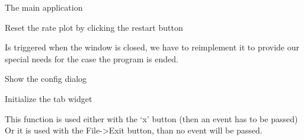 \documentclass[letterpaper,10pt,english]{sphinxmanual}
\begin{document}
\begin{fulllineitems}
\label{muonic:muonic.gui.MainWindow.MainWindow}
The main application

\begin{fulllineitems}
\label{muonic:muonic.gui.MainWindow.MainWindow.clear_function}
Reset the rate plot by clicking the restart button

\end{fulllineitems}


\begin{fulllineitems}
\label{muonic:muonic.gui.MainWindow.MainWindow.closeEvent}
Is triggered when the window is closed, we have to reimplement it
to provide our special needs for the case the program is ended.

\end{fulllineitems}


\begin{fulllineitems}
\label{muonic:muonic.gui.MainWindow.MainWindow.config_menu}
Show the config dialog

\end{fulllineitems}


\begin{fulllineitems}
\label{muonic:muonic.gui.MainWindow.MainWindow.create_widgets}
Initialize the tab widget

\end{fulllineitems}


\begin{fulllineitems}
\label{muonic:muonic.gui.MainWindow.MainWindow.exit_program}
This function is used either with the `x' button
(then an event has to be passed)
Or it is used with the File-\textgreater{}Exit button, than no event
will be passed.


\end{fulllineitems}
\end{fulllineitems}
\end{document}
